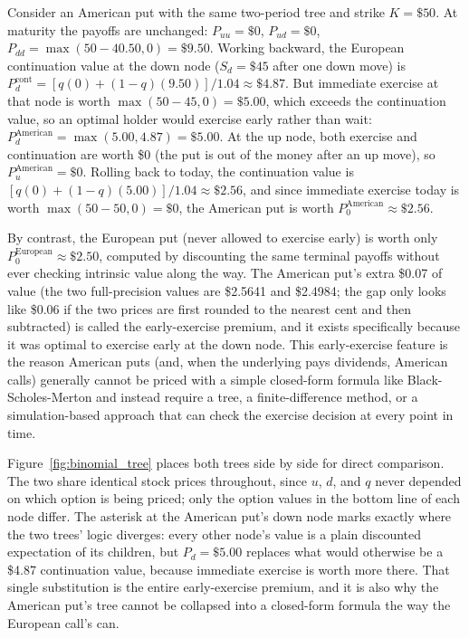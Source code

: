 \documentclass[../ai_in_finance]{subfiles}
\begin{document}
Consider an American put with the same two-period tree and strike $K=\$50$. At maturity the payoffs are unchanged: $P_{uu}=\$0$, $P_{ud}=\$0$, $P_{dd}=\max(50-40.50,0)=\$9.50$. Working backward, the European continuation value at the down node ($S_d=\$45$ after one down move) is $P_d^{\text{cont}} = [q(0) + (1-q)(9.50)]/1.04 \approx \$4.87$. But immediate exercise at that node is worth $\max(50-45,0)=\$5.00$, which exceeds the continuation value, so an optimal holder would exercise early rather than wait: $P_d^{\text{American}} = \max(5.00, 4.87) = \$5.00$. At the up node, both exercise and continuation are worth \$0 (the put is out of the money after an up move), so $P_u^{\text{American}}=\$0$. Rolling back to today, the continuation value is $[q(0) + (1-q)(5.00)]/1.04 \approx \$2.56$, and since immediate exercise today is worth $\max(50-50,0)=\$0$, the American put is worth $P_0^{\text{American}} \approx \$2.56$.

By contrast, the European put (never allowed to exercise early) is worth only $P_0^{\text{European}} \approx \$2.50$, computed by discounting the same terminal payoffs without ever checking intrinsic value along the way. The American put's extra \$0.07 of value (the two full-precision values are \$2.5641 and \$2.4984; the gap only looks like \$0.06 if the two prices are first rounded to the nearest cent and then subtracted) is called the early-exercise premium, and it exists specifically because it was optimal to exercise early at the down node. This early-exercise feature is the reason American puts (and, when the underlying pays dividends, American calls) generally cannot be priced with a simple closed-form formula like Black-Scholes-Merton and instead require a tree, a finite-difference method, or a simulation-based approach that can check the exercise decision at every point in time.

Figure~\ref{fig:binomial_tree} places both trees side by side for direct comparison. The two share identical stock prices throughout, since $u$, $d$, and $q$ never depended on which option is being priced; only the option values in the bottom line of each node differ. The asterisk at the American put's down node marks exactly where the two trees' logic diverges: every other node's value is a plain discounted expectation of its children, but $P_d=\$5.00$ replaces what would otherwise be a \$4.87 continuation value, because immediate exercise is worth more there. That single substitution is the entire early-exercise premium, and it is also why the American put's tree cannot be collapsed into a closed-form formula the way the European call's can.
\end{document}
